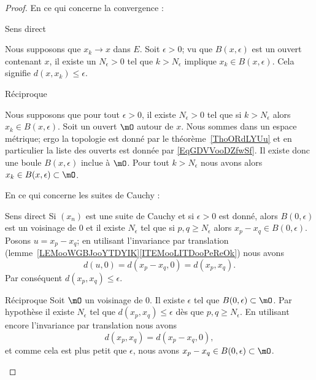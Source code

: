 \begin{proof}
   En ce qui concerne la convergence :
    \begin{subproof}
        \item[Sens direct]

            Nous supposons que \( x_k\to x\) dans \( E\). Soit \( \epsilon>0\); vu que \( B(x,\epsilon)\) est un ouvert contenant \( x\), il existe un \( N_{\epsilon}>0 \) tel que \( k>N_{\epsilon}\) implique \( x_k\in B(x,\epsilon)\). Cela signifie \( d(x,x_k)\leq \epsilon\).

        \item[Réciproque]

            Nous supposons que pour tout \( \epsilon>0\), il existe \( N_{\epsilon}>0\) tel que si \( k>N_{\epsilon}\) alors \( x_k\in B(x,\epsilon)\). Soit un ouvert \( \mO\) autour de \( x\). Nous sommes dans un espace métrique; ergo la topologie est donné par le théorème~\ref{ThoORdLYUu} et en particulier la liste des ouverts est donnée par \eqref{EqGDVVooDZfwSf}. Il existe donc une boule \( B(x,\epsilon)\) inclue à \( \mO\). Pour tout \( k>N_{\epsilon}\) nous avons alors \( x_k\in B(x,\epsilon)\subset\mO\).
    \end{subproof}
    En ce qui concerne les suites de Cauchy :
    \begin{subproof}
    \item[Sens direct]
        Si \( (x_n)\) est une suite de Cauchy et si \( \epsilon>0\) est donné, alors \( B(0,\epsilon)\) est un voisinage de \( 0\) et il existe \( N_{\epsilon}\) tel que si \( p,q\geq N_{\epsilon}\) alors \( x_p-x_q\in B(0,\epsilon)\). Posons \( u=x_p-x_q\); en utilisant l'invariance par translation (lemme~\ref{LEMooWGBJooYTDYIK}\ref{ITEMooLITDooPeReOk}) nous avons
        \begin{equation}
            d(u,0)=d(x_p-x_q,0)=d(x_p,x_q).
        \end{equation}
        Par conséquent \( d(x_p,x_q)\leq \epsilon\).
    \item[Réciproque]
        Soit \( \mO\) un voisinage de \( 0\). Il existe \( \epsilon\) tel que \( B(0,\epsilon)\subset \mO\). Par hypothèse il existe \( N_{\epsilon}\) tel que \( d(x_p,x_q)\leq \epsilon\) dès que \( p,q\geq N_{\epsilon}\). En utilisant encore l'invariance par translation nous avons
        \begin{equation}
            d(x_p,x_q)=d(x_p-x_q,0),
        \end{equation}
        et comme cela est plus petit que \( \epsilon\), nous avons \( x_p-x_q\in B(0,\epsilon)\subset\mO\).
    \end{subproof}
\end{proof}

